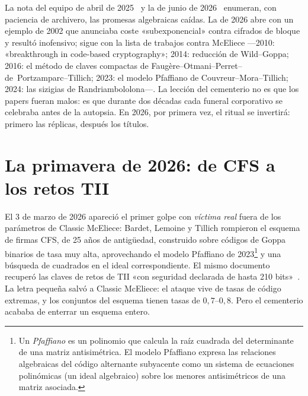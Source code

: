 \documentclass[11pt,a4paper,oneside]{report}
\begin{document}
\begin{historia}
La nota del equipo de abril de 2025~\cite{cm529} y la de junio de
2026~\cite{cm610} enumeran, con paciencia de archivero, las
promesas algebraicas caídas. La de 2026 abre con un ejemplo de 2002
que anunciaba coste «subexponencial» contra cifrados de bloque y
resultó inofensivo; sigue con la lista de trabajos contra McEliece
---2010: «breakthrough in code-based cryptography»; 2014:
reducción de Wild--Goppa; 2016: el método de claves compactas de
Faugère--Otmani--Perret--de~Portzamparc--Tillich; 2023: el
modelo Pfaffiano de Couvreur--Mora--Tillich; 2024: las sizigias de
Randriambololona---. La lección del cementerio no es que los papers
fueran malos: es que durante dos décadas cada funeral corporativo
se celebraba antes de la autopsia. En 2026, por primera vez, el
ritual se invertirá: primero las réplicas, después los títulos.
\end{historia}

\section{La primavera de 2026: de CFS a los retos TII}\label{sec:2026-primavera}

El 3 de marzo de 2026 apareció el primer golpe con \emph{víctima
real} fuera de los parámetros de Classic McEliece: Bardet, Lemoine y
Tillich rompieron el esquema de firmas CFS, de 25 años de
antigüedad, construido sobre códigos de Goppa binarios de tasa muy
alta, aprovechando el modelo Pfaffiano de 2023\footnote{Un \emph{Pfaffiano}
es un polinomio que calcula la raíz cuadrada del determinante de una matriz
antisimétrica. El modelo Pfaffiano expresa las relaciones algebraicas del
código alternante subyacente como un sistema de ecuaciones polinómicas (un
ideal algebraico) sobre los menores antisimétricos de una matriz asociada.}
y una búsqueda de cuadrados en el ideal correspondiente. El mismo documento recuperó
las claves de retos de TII «con seguridad declarada de hasta 210
bits»~\cite{bardet2026}. La letra pequeña salvó a Classic McEliece:
el ataque vive de tasas de código extremas, y los conjuntos del
esquema tienen tasas de $0{,}7$--$0{,}8$. Pero el cementerio acababa
de enterrar un esquema entero.
\end{document}
